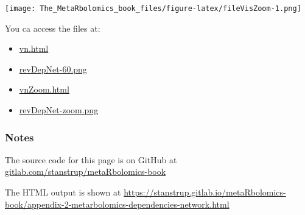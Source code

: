 \documentclass[]{article}
\newenvironment{Shaded}{\begin{snugshade}}{\end{snugshade}}
\newcommand{\DataTypeTok}[1]{\textcolor[rgb]{0.13,0.29,0.53}{#1}}
\newcommand{\DecValTok}[1]{\textcolor[rgb]{0.00,0.00,0.81}{#1}}
\newcommand{\KeywordTok}[1]{\textcolor[rgb]{0.13,0.29,0.53}{\textbf{#1}}}
\newcommand{\NormalTok}[1]{#1}
\newcommand{\OperatorTok}[1]{\textcolor[rgb]{0.81,0.36,0.00}{\textbf{#1}}}
\newcommand{\StringTok}[1]{\textcolor[rgb]{0.31,0.60,0.02}{#1}}
\providecommand{\tightlist}{%
  \setlength{\itemsep}{0pt}\setlength{\parskip}{0pt}}
\begin{document}
\begin{Shaded}
\end{Shaded}

\texttt{[image: The\_MetaRbolomics\_book\_files/figure-latex/fileVisZoom-1.png]}

You ca access the files at:

\begin{itemize}
\tightlist
\item
  \url{vn.html}
\item
  \url{revDepNet-60.png}
\item
  \url{vnZoom.html}
\item
  \url{revDepNet-zoom.png}
\end{itemize}

\hypertarget{notes}{%
\subsubsection*{Notes}\label{notes}}

The source code for this page is on GitHub at \href{https://gitlab.com/stanstrup/metaRbolomics-book}{gitlab.com/stanstrup/metaRbolomics-book}

The HTML output is shown at
\href{appendix-2-metarbolomics-dependencies-network.html}{https://stanstrup.gitlab.io/metaRbolomics-book/appendix-2-metarbolomics-dependencies-network.html}
\end{document}
